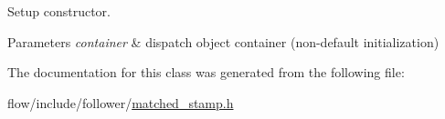 Setup constructor. 


\begin{DoxyParams}{Parameters}
{\em container} & dispatch object container (non-\/default initialization) \\
\hline
\end{DoxyParams}


The documentation for this class was generated from the following file\+:\begin{DoxyCompactItemize}
\item 
flow/include/follower/\hyperlink{matched__stamp_8h}{matched\+\_\+stamp.\+h}\end{DoxyCompactItemize}
